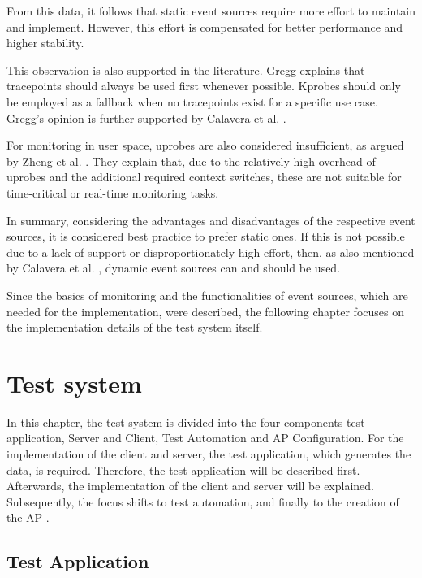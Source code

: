 From this data, it follows that static event sources require more effort to maintain and implement.  
However, this effort is compensated for better performance and higher stability.  

This observation is also supported in the literature.  
Gregg \cite[Chap.~2.9]{Gregg_2020} explains that tracepoints should always be used first whenever possible.  
Kprobes should only be employed as a fallback when no tracepoints exist for a specific use case.  
Gregg's opinion is further supported by Calavera et al. \cite[Chap.~4]{Calavera_Fontana_Frazelle_2020}.  

For monitoring in user space, \acp{uprobe} are also considered insufficient, as argued by Zheng et al. \cite[p.~3]{zheng2023bpftimeuserspaceebpfruntime}.  
They explain that, due to the relatively high overhead of \acp{uprobe} and the additional required context switches, these are not suitable for time-critical or real-time monitoring tasks.  

In summary, considering the advantages and disadvantages of the respective event sources, it is considered best practice to prefer static ones.  
If this is not possible due to a lack of support or disproportionately high effort, then, as also mentioned by Calavera et al. \cite[Chap.~4]{Calavera_Fontana_Frazelle_2020}, dynamic event sources can and should be used.  

Since the basics of monitoring and the functionalities of event sources, which are needed for the implementation, were described, the following chapter focuses on the implementation details of the test system itself.

\section{Test system}
In this chapter, the test system is divided into the four components test application, Server and Client, Test Automation and \ac{AP} Configuration. 
For the implementation of the client and server, the test application, which generates the data, is required.
Therefore, the test application will be described first.  
Afterwards, the implementation of the client and server will be explained.  
Subsequently, the focus shifts to test automation, and finally to the creation of the \ac{AP} .  

\subsection{Test Application} \label{subsec:appl}

